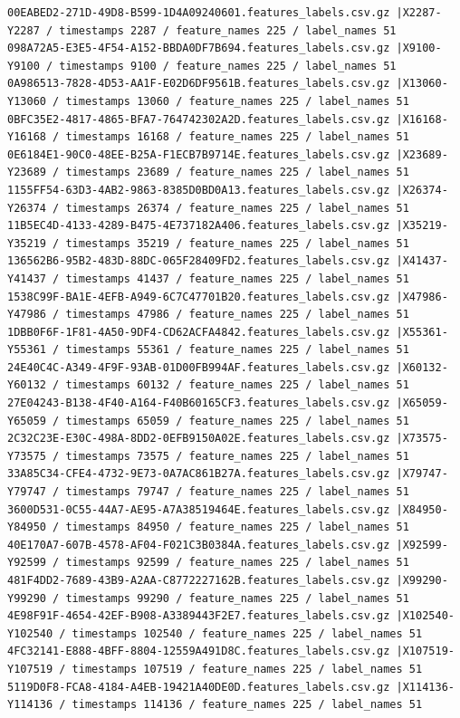 \documentclass{UoNMCHA}
\numberwithin{equation}{section}
\begin{document}
\begin{lstlisting}[breaklines=true]
00EABED2-271D-49D8-B599-1D4A09240601.features_labels.csv.gz |X2287-Y2287 / timestamps 2287 / feature_names 225 / label_names 51
098A72A5-E3E5-4F54-A152-BBDA0DF7B694.features_labels.csv.gz |X9100-Y9100 / timestamps 9100 / feature_names 225 / label_names 51
0A986513-7828-4D53-AA1F-E02D6DF9561B.features_labels.csv.gz |X13060-Y13060 / timestamps 13060 / feature_names 225 / label_names 51
0BFC35E2-4817-4865-BFA7-764742302A2D.features_labels.csv.gz |X16168-Y16168 / timestamps 16168 / feature_names 225 / label_names 51
0E6184E1-90C0-48EE-B25A-F1ECB7B9714E.features_labels.csv.gz |X23689-Y23689 / timestamps 23689 / feature_names 225 / label_names 51
1155FF54-63D3-4AB2-9863-8385D0BD0A13.features_labels.csv.gz |X26374-Y26374 / timestamps 26374 / feature_names 225 / label_names 51
11B5EC4D-4133-4289-B475-4E737182A406.features_labels.csv.gz |X35219-Y35219 / timestamps 35219 / feature_names 225 / label_names 51
136562B6-95B2-483D-88DC-065F28409FD2.features_labels.csv.gz |X41437-Y41437 / timestamps 41437 / feature_names 225 / label_names 51
1538C99F-BA1E-4EFB-A949-6C7C47701B20.features_labels.csv.gz |X47986-Y47986 / timestamps 47986 / feature_names 225 / label_names 51
1DBB0F6F-1F81-4A50-9DF4-CD62ACFA4842.features_labels.csv.gz |X55361-Y55361 / timestamps 55361 / feature_names 225 / label_names 51
24E40C4C-A349-4F9F-93AB-01D00FB994AF.features_labels.csv.gz |X60132-Y60132 / timestamps 60132 / feature_names 225 / label_names 51
27E04243-B138-4F40-A164-F40B60165CF3.features_labels.csv.gz |X65059-Y65059 / timestamps 65059 / feature_names 225 / label_names 51
2C32C23E-E30C-498A-8DD2-0EFB9150A02E.features_labels.csv.gz |X73575-Y73575 / timestamps 73575 / feature_names 225 / label_names 51
33A85C34-CFE4-4732-9E73-0A7AC861B27A.features_labels.csv.gz |X79747-Y79747 / timestamps 79747 / feature_names 225 / label_names 51
3600D531-0C55-44A7-AE95-A7A38519464E.features_labels.csv.gz |X84950-Y84950 / timestamps 84950 / feature_names 225 / label_names 51
40E170A7-607B-4578-AF04-F021C3B0384A.features_labels.csv.gz |X92599-Y92599 / timestamps 92599 / feature_names 225 / label_names 51
481F4DD2-7689-43B9-A2AA-C8772227162B.features_labels.csv.gz |X99290-Y99290 / timestamps 99290 / feature_names 225 / label_names 51
4E98F91F-4654-42EF-B908-A3389443F2E7.features_labels.csv.gz |X102540-Y102540 / timestamps 102540 / feature_names 225 / label_names 51
4FC32141-E888-4BFF-8804-12559A491D8C.features_labels.csv.gz |X107519-Y107519 / timestamps 107519 / feature_names 225 / label_names 51
5119D0F8-FCA8-4184-A4EB-19421A40DE0D.features_labels.csv.gz |X114136-Y114136 / timestamps 114136 / feature_names 225 / label_names 51

\end{lstlisting}
\end{document}

